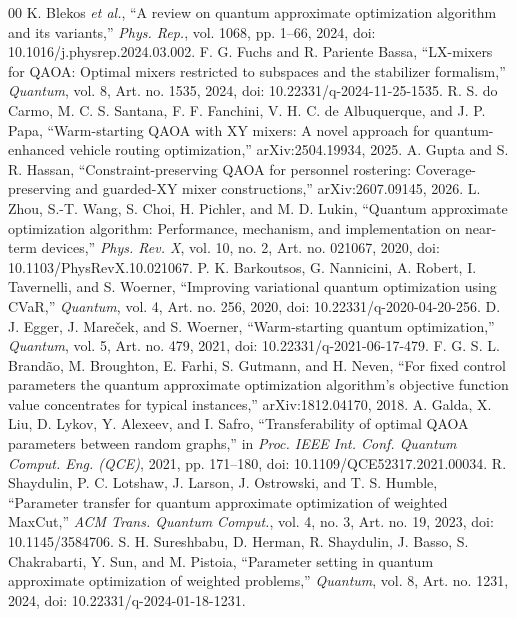 \documentclass[conference]{IEEEtran}
\begin{document}
\begin{thebibliography}{00}
 K. Blekos \textit{et al.}, ``A review on quantum approximate optimization algorithm and its variants,'' \textit{Phys. Rep.}, vol. 1068, pp. 1--66, 2024, doi: 10.1016/j.physrep.2024.03.002.
 F. G. Fuchs and R. Pariente Bassa, ``LX-mixers for QAOA: Optimal mixers restricted to subspaces and the stabilizer formalism,'' \textit{Quantum}, vol. 8, Art. no. 1535, 2024, doi: 10.22331/q-2024-11-25-1535.
 R. S. do Carmo, M. C. S. Santana, F. F. Fanchini, V. H. C. de Albuquerque, and J. P. Papa, ``Warm-starting QAOA with XY mixers: A novel approach for quantum-enhanced vehicle routing optimization,'' arXiv:2504.19934, 2025.
 A. Gupta and S. R. Hassan, ``Constraint-preserving QAOA for personnel rostering: Coverage-preserving and guarded-XY mixer constructions,'' arXiv:2607.09145, 2026.
 L. Zhou, S.-T. Wang, S. Choi, H. Pichler, and M. D. Lukin, ``Quantum approximate optimization algorithm: Performance, mechanism, and implementation on near-term devices,'' \textit{Phys. Rev. X}, vol. 10, no. 2, Art. no. 021067, 2020, doi: 10.1103/PhysRevX.10.021067.
 P. K. Barkoutsos, G. Nannicini, A. Robert, I. Tavernelli, and S. Woerner, ``Improving variational quantum optimization using CVaR,'' \textit{Quantum}, vol. 4, Art. no. 256, 2020, doi: 10.22331/q-2020-04-20-256.
 D. J. Egger, J. Mare\v{c}ek, and S. Woerner, ``Warm-starting quantum optimization,'' \textit{Quantum}, vol. 5, Art. no. 479, 2021, doi: 10.22331/q-2021-06-17-479.
 F. G. S. L. Brand\~{a}o, M. Broughton, E. Farhi, S. Gutmann, and H. Neven, ``For fixed control parameters the quantum approximate optimization algorithm's objective function value concentrates for typical instances,'' arXiv:1812.04170, 2018.
 A. Galda, X. Liu, D. Lykov, Y. Alexeev, and I. Safro, ``Transferability of optimal QAOA parameters between random graphs,'' in \textit{Proc. IEEE Int. Conf. Quantum Comput. Eng. (QCE)}, 2021, pp. 171--180, doi: 10.1109/QCE52317.2021.00034.
 R. Shaydulin, P. C. Lotshaw, J. Larson, J. Ostrowski, and T. S. Humble, ``Parameter transfer for quantum approximate optimization of weighted MaxCut,'' \textit{ACM Trans. Quantum Comput.}, vol. 4, no. 3, Art. no. 19, 2023, doi: 10.1145/3584706.
 S. H. Sureshbabu, D. Herman, R. Shaydulin, J. Basso, S. Chakrabarti, Y. Sun, and M. Pistoia, ``Parameter setting in quantum approximate optimization of weighted problems,'' \textit{Quantum}, vol. 8, Art. no. 1231, 2024, doi: 10.22331/q-2024-01-18-1231.

\end{thebibliography}
\end{document}
